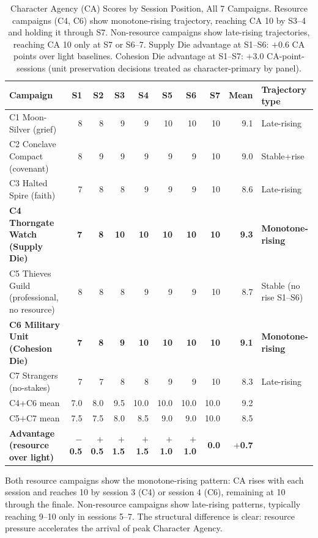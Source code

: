 \begin{table}[t]
\caption{Character Agency (CA) Scores by Session Position, All 7 Campaigns. Resource
  campaigns (C4, C6) show monotone-rising trajectory, reaching CA 10 by S3--4 and
  holding it through S7. Non-resource campaigns show late-rising trajectories, reaching
  CA 10 only at S7 or S6--7. Supply Die advantage at S1--S6: $+0.6$ CA points over
  light baselines. Cohesion Die advantage at S1--S7: $+3.0$ CA-point-sessions (unit
  preservation decisions treated as character-primary by panel).}
\label{tab:ca-trajectories}
\begin{tabular}{@{}lrrrrrrrrl@{}}
\toprule
Campaign & S1 & S2 & S3 & S4 & S5 & S6 & S7 & Mean & Trajectory type \\
\midrule
C1 Moon-Silver (grief) & 8 & 8 & 9 & 9 & 10 & 10 & 10 & 9.1 & Late-rising \\
C2 Conclave Compact (covenant) & 8 & 9 & 9 & 9 & 9 & 9 & 10 & 9.0 & Stable+rise \\
C3 Halted Spire (faith) & 7 & 8 & 8 & 9 & 9 & 9 & 10 & 8.6 & Late-rising \\
\textbf{C4 Thorngate Watch (Supply Die)} & \textbf{7} & \textbf{8} & \textbf{10} & \textbf{10} & \textbf{10} & \textbf{10} & \textbf{10} & \textbf{9.3} & \textbf{Monotone-rising} \\
C5 Thieves Guild (professional, no resource) & 8 & 8 & 8 & 9 & 9 & 9 & 10 & 8.7 & Stable (no rise S1--S6) \\
\textbf{C6 Military Unit (Cohesion Die)} & \textbf{7} & \textbf{8} & \textbf{9} & \textbf{10} & \textbf{10} & \textbf{10} & \textbf{10} & \textbf{9.1} & \textbf{Monotone-rising} \\
C7 Strangers (no-stakes) & 7 & 7 & 8 & 8 & 9 & 9 & 10 & 8.3 & Late-rising \\
\midrule
C4+C6 mean & 7.0 & 8.0 & 9.5 & 10.0 & 10.0 & 10.0 & 10.0 & 9.2 & \\
C5+C7 mean & 7.5 & 7.5 & 8.0 & 8.5 & 9.0 & 9.0 & 10.0 & 8.5 & \\
\midrule
\textbf{Advantage (resource over light)} & \textbf{$-$0.5} & \textbf{$+$0.5} & \textbf{$+$1.5} & \textbf{$+$1.5} & \textbf{$+$1.0} & \textbf{$+$1.0} & \textbf{0.0} & \textbf{$+$0.7} & \\
\bottomrule
\end{tabular}
\end{table}

Both resource campaigns show the monotone-rising pattern: CA rises with each session
and reaches 10 by session 3 (C4) or session 4 (C6), remaining at 10 through the finale.
Non-resource campaigns show late-rising patterns, typically reaching 9--10 only in
sessions 5--7. The structural difference is clear: resource pressure accelerates the
arrival of peak Character Agency.

